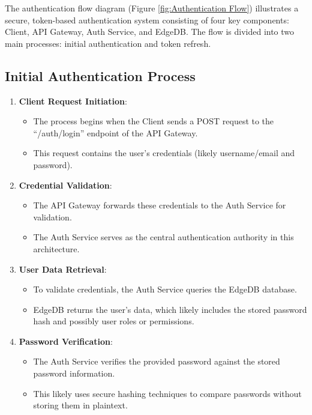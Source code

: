 The authentication flow diagram (Figure \ref{fig:Authentication Flow}) illustrates a secure, token-based authentication system consisting of four key components: Client, API Gateway, Auth Service, and EdgeDB. The flow is divided into two main processes: initial authentication and token refresh.

\subsection{Initial Authentication Process}

\begin{enumerate}
    \item \textbf{Client Request Initiation}:
    \begin{itemize}
        \item The process begins when the Client sends a POST request to the ``/auth/login'' endpoint of the API Gateway.
        \item This request contains the user's credentials (likely username/email and password).
    \end{itemize}
    
    \item \textbf{Credential Validation}:
    \begin{itemize}
        \item The API Gateway forwards these credentials to the Auth Service for validation.
        \item The Auth Service serves as the central authentication authority in this architecture.
    \end{itemize}
    
    \item \textbf{User Data Retrieval}:
    \begin{itemize}
        \item To validate credentials, the Auth Service queries the EdgeDB database.
        \item EdgeDB returns the user's data, which likely includes the stored password hash and possibly user roles or permissions.
    \end{itemize}
    
    \item \textbf{Password Verification}:
    \begin{itemize}
        \item The Auth Service verifies the provided password against the stored password information.
        \item This likely uses secure hashing techniques to compare passwords without storing them in plaintext.
    \end{itemize}
    

\end{enumerate}
